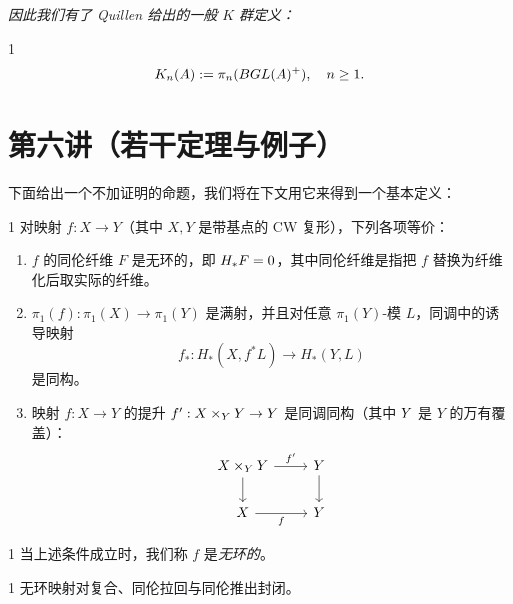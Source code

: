 \emph{因此我们有了 Quillen 给出的一般 $K$ 群定义：}

\begin{defn}{1}
\[ K_n(A):=\pi_n(BGL(A)^+),\quad n\ge 1. \]
\end{defn}



\section{第六讲（若干定理与例子）}

下面给出一个不加证明的命题，我们将在下文用它来得到一个基本定义：

\begin{prop}{1} 对映射 $f:X\to Y$（其中 $X,Y$ 是带基点的 CW 复形），下列各项等价：
\begin{enumerate}[label=(\alph*.),leftmargin=2.6em,itemsep=3pt]
\item $f$ 的同伦纤维 $F$ 是无环的，即 $ H_*F=0$，其中同伦纤维是指把 $f$ 替换为纤维化后取实际的纤维。
\item $\pi_1(f):\pi_1(X)\to\pi_1(Y)$ 是满射，并且对任意 $\pi_1(Y)$-模 $L$，同调中的诱导映射
\[ f_*:H_*(X,f^*L)\to H_*(Y,L) \]
是同构。
\item 映射 $f:X\to Y$ 的提升 $f':X\times_Y Y\to Y$ 是同调同构（其中 $ Y$ 是 $Y$ 的万有覆盖）：
\[
\begin{tikzcd}
X\times_Y\wt Y \arrow[r,"f'"] \arrow[d] & \wt Y \arrow[d] \\
X \arrow[r,"f"'] & Y
\end{tikzcd}
\]
\end{enumerate}
\end{prop}

\begin{defn}{1} 当上述条件成立时，我们称 $f$ 是\emph{无环的}。 \end{defn}

\begin{cor}{1} 无环映射对复合、同伦拉回与同伦推出封闭。 \end{cor}

